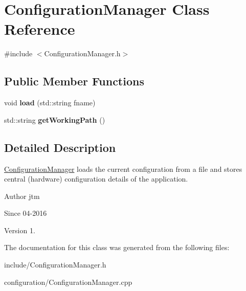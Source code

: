 \hypertarget{classConfigurationManager}{}\section{Configuration\+Manager Class Reference}
\label{classConfigurationManager}


{\ttfamily \#include $<$Configuration\+Manager.\+h$>$}

\subsection*{Public Member Functions}
\begin{DoxyCompactItemize}
\item 
void {\bfseries load} (std\+::string fname)\hypertarget{classConfigurationManager_a066a7ae7e01b7ba6b62782fd3eeffaab}{}\label{classConfigurationManager_a066a7ae7e01b7ba6b62782fd3eeffaab}

\item 
std\+::string {\bfseries get\+Working\+Path} ()\hypertarget{classConfigurationManager_ab4fac4121f154fb83b67a727b650c436}{}\label{classConfigurationManager_ab4fac4121f154fb83b67a727b650c436}

\end{DoxyCompactItemize}


\subsection{Detailed Description}
\hyperlink{classConfigurationManager}{Configuration\+Manager} loads the current configuration from a file and stores central (hardware) configuration details of the application.

\begin{DoxyAuthor}{Author}
jtm 
\end{DoxyAuthor}
\begin{DoxySince}{Since}
04-\/2016 
\end{DoxySince}
\begin{DoxyVersion}{Version}
1. 
\end{DoxyVersion}


The documentation for this class was generated from the following files\+:\begin{DoxyCompactItemize}
\item 
include/Configuration\+Manager.\+h\item 
configuration/Configuration\+Manager.\+cpp\end{DoxyCompactItemize}
